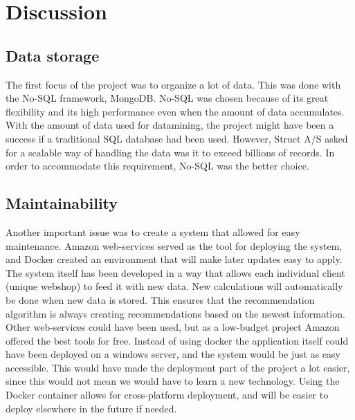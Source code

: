 
\chapter{Discussion} %

\label{Chapter7} %

\section{Data storage}
The first focus of the project was to organize a lot of data. This was done with the No-SQL framework, MongoDB. No-SQL was chosen because of its great flexibility and its high performance even when the amount of data accumulates. With the amount of data used for datamining, the project might have been a success if a traditional SQL database had been used. However, Struct A/S asked for a scalable way of handling the data was it to exceed billions of records. In order to accommodate this requirement, No-SQL was the better choice.

\section{Maintainability}
Another important issue was to create a system that allowed for easy maintenance. Amazon web-services served as the tool for deploying the system, and Docker created an environment that will make later updates easy to apply. The system itself has been developed in a way that allows each individual client (unique webshop) to feed it with new data. New calculations will automatically be done when new data is stored. This ensures that the recommendation algorithm is always creating recommendations based on the newest information. Other web-services could have been used, but as a low-budget project Amazon offered the best tools for free.
Instead of using docker the application itself could have been deployed on a windows server, and the system would be just as easy accessible. This would have made the deployment part of the project a lot easier, since this would not mean we would have to learn a new technology. Using the Docker container allows for cross-platform deployment, and will be easier to deploy elsewhere in the future if needed.

